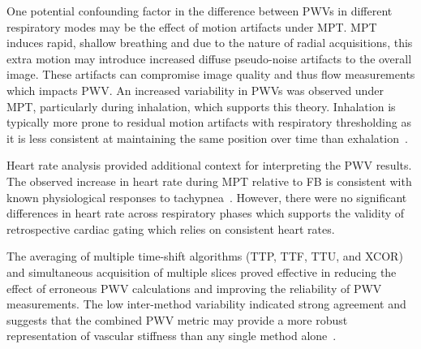 One potential confounding factor in the difference between PWVs in different respiratory modes may be the effect of motion artifacts under MPT\@. MPT induces rapid, shallow breathing and due to the nature of radial acquisitions, this extra motion may introduce increased diffuse pseudo-noise artifacts to the overall image. These artifacts can compromise image quality and thus flow measurements which impacts PWV\@. An increased variability in PWVs was observed under MPT, particularly during inhalation, which supports this theory. Inhalation is typically more prone to residual motion artifacts with respiratory thresholding as it is less consistent at maintaining the same position over time than exhalation~\cite{vuComparisonEndExpirationEndInspiration2019}.

Heart rate analysis provided additional context for interpreting the PWV results. The observed increase in heart rate during MPT relative to FB is consistent with known physiological responses to tachypnea~\cite{bloomfieldComparisonSpontaneousVs2001}. However, there were no significant differences in heart rate across respiratory phases which supports the validity of retrospective cardiac gating which relies on consistent heart rates. 

The averaging of multiple time-shift algorithms (TTP, TTF, TTU, and XCOR) and simultaneous acquisition of multiple slices proved effective in reducing the effect of erroneous PWV calculations and improving the reliability of PWV measurements. The low inter-method variability indicated strong agreement and suggests that the combined PWV metric may provide a more robust representation of vascular stiffness than any single method alone~\cite{wentlandReviewMRIbasedMeasurements2014}.

